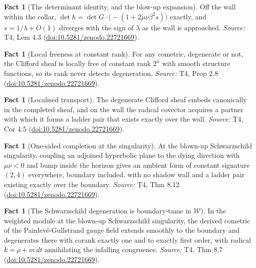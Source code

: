 \documentclass[11pt]{article}
\theoremstyle{definition}
\newtheorem{fact}[theorem]{Fact}
\theoremstyle{plain}
\providecommand{\dtPG}{}\renewcommand{\dtPG}{dt}
\providecommand{\shW}{}\renewcommand{\shW}{\mathcal{W}}
\begin{document}
\begin{fact}[The determinant identity, and the blow-up expansion]\label{c:sheaf.determinant-identity-blow-up-expansion}
Off the wall within the collar, $\det h = \det G \cdot \bigl(-(1 + 2\mu\nu\beta^2 s)\bigr)$ exactly, and $s = 1/\lambda + O(1)$ diverges with the sign of $\lambda$ as the wall is approached.
\emph{Source:} T4, Lem 4.3 (\href{https://doi.org/10.5281/zenodo.22721669}{doi:10.5281/zenodo.22721669}).
\end{fact}

\begin{fact}[Local freeness at constant rank]\label{c:sheaf.local-freeness-constant-rank}
For any cometric, degenerate or not, the Clifford sheaf is locally free of constant rank $2^n$ with smooth structure functions, so its rank never detects degeneration.
\emph{Source:} T4, Prop 2.8 (\href{https://doi.org/10.5281/zenodo.22721669}{doi:10.5281/zenodo.22721669}).
\end{fact}

\begin{fact}[Localised transport]\label{c:sheaf.localised-transport}
The degenerate Clifford sheaf embeds canonically in the completed sheaf, and on the wall the radical covector acquires a partner with which it forms a ladder pair that exists exactly over the wall.
\emph{Source:} T4, Cor 4.5 (\href{https://doi.org/10.5281/zenodo.22721669}{doi:10.5281/zenodo.22721669}).
\end{fact}

\begin{fact}[One-sided completion at the singularity]\label{c:sheaf.one-sided-completion-singularity}
At the blown-up Schwarzschild singularity, coupling an adjoined hyperbolic plane to the dying direction with $\mu\nu < 0$ and bump inside the horizon gives an ambient form of constant signature $(2,4)$ everywhere, boundary included, with no shadow wall and a ladder pair existing exactly over the boundary.
\emph{Source:} T4, Thm 8.12 (\href{https://doi.org/10.5281/zenodo.22721669}{doi:10.5281/zenodo.22721669}).
\end{fact}

\begin{fact}[The Schwarzschild degeneration is boundary-tame in $\shW$]\label{c:sheaf.schwarzschild-degeneration-boundary-tame}
In the weighted module at the blown-up Schwarzschild singularity, the derived cometric of the Painlev\'e-Gullstrand gauge field extends smoothly to the boundary and degenerates there with corank exactly one and to exactly first order, with radical $k = \rho + m\,\dtPG$ annihilating the infalling congruence.
\emph{Source:} T4, Thm 8.7 (\href{https://doi.org/10.5281/zenodo.22721669}{doi:10.5281/zenodo.22721669}).
\end{fact}
\end{document}
